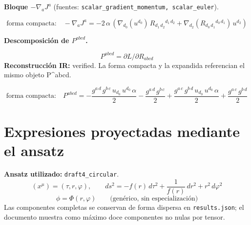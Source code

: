 \documentclass[11pt]{article}
\begin{document}
\par\smallskip\noindent\textbf{Bloque $ -\nabla_a J^a $} (fuentes: \texttt{scalar\_gradient\_momentum, scalar\_euler}).\par
\begin{dmath*}[breakdepth={5}]
\text{forma compacta:}\quad -\nabla_a J^a = -2\,\alpha\,\left(\nabla_{d_{0}}\!\left(u{}^{d_{0}}\right)\,R{}_{d_{1}\,d_{2}}{}^{d_{1}\,d_{2}} + \nabla_{d_{2}}\!\left(R{}_{d_{0}\,d_{1}}{}^{d_{0}\,d_{1}}\right)\,u{}^{d_{2}}\right)
\end{dmath*}
\par\medskip\noindent\textbf{Descomposición de $ P^{abcd} $.}\par
\begin{dmath*}[breakdepth={5}]
P^{abcd}=\partial L/\partial R_{abcd}
\end{dmath*}
\textbf{Reconstrucción IR:} verified. La forma compacta y la expandida referencian el mismo objeto P^{abcd}.\par
\begin{dmath*}[breakdepth={5}]
\text{forma compacta:}\quad P^{abcd} = -\frac{g{}^{a\,d}\,g{}^{b\,c}\,u{}_{d_{0}}\,u{}^{d_{0}}\,\alpha}{2} - \frac{g{}^{a\,d}\,g{}^{b\,c}}{2} + \frac{g{}^{a\,c}\,g{}^{b\,d}\,u{}_{d_{0}}\,u{}^{d_{0}}\,\alpha}{2} + \frac{g{}^{a\,c}\,g{}^{b\,d}}{2}
\end{dmath*}
\section*{Expresiones proyectadas mediante el ansatz}
\textbf{Ansatz utilizado:} \texttt{draft4\_circular}.
\begin{dmath*}[breakdepth={3}]
(x^\mu)=\left(\tau, r, \varphi\right),\qquad ds^2 = -f\!\left(r\right)\,d\tau^2 + \frac{1}{f\!\left(r\right)}\,dr^2 + {r}^{2}\,d\varphi^2
\end{dmath*}
\begin{dmath*}[breakdepth={3}]
\phi = \Phi\!\left(r, \varphi\right)\qquad\text{(genérico, sin especialización)}
\end{dmath*}
Las componentes completas se conservan de forma dispersa en \texttt{results.json}; el documento muestra como máximo doce componentes no nulas por tensor.
\end{document}
